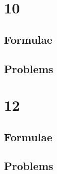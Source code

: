 \documentclass[journal]{IEEEtran}
\begin{document}
\section{10}
\subsection{Formulae}

\subsection{Problems}
\graphicspath{{10/}}

\clearpage

\section{12}
\subsection{Formulae}

\subsection{Problems}
\graphicspath{{12/}}

\end{document}
